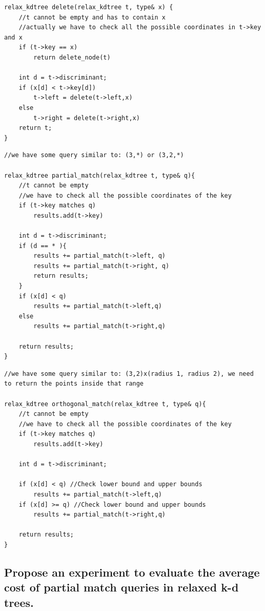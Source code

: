 \documentclass{article}
\begin{document}
\begin{lstlisting}[caption=Deletion of relaxed kd-trees, style=myC]
relax_kdtree delete(relax_kdtree t, type& x) {
    //t cannot be empty and has to contain x
    //actually we have to check all the possible coordinates in t->key and x
    if (t->key == x) 
        return delete_node(t)

    int d = t->discriminant;
    if (x[d] < t->key[d])
        t->left = delete(t->left,x)
    else
        t->right = delete(t->right,x)
    return t;
}
\end{lstlisting}



\begin{lstlisting}[caption=Partial match of relaxed kd-trees, style=myC]
//we have some query similar to: (3,*) or (3,2,*)

relax_kdtree partial_match(relax_kdtree t, type& q){
    //t cannot be empty
    //we have to check all the possible coordinates of the key
    if (t->key matches q) 
        results.add(t->key)

    int d = t->discriminant;
    if (d == * ){
        results += partial_match(t->left, q)
        results += partial_match(t->right, q)
        return results;
    }
    if (x[d] < q)
        results += partial_match(t->left,q)
    else
        results += partial_match(t->right,q)

    return results;
}

\end{lstlisting}


\begin{lstlisting}[caption=Orthogonal match of relaxed kd-trees, style=myC]
//we have some query similar to: (3,2)x(radius 1, radius 2), we need to return the points inside that range

relax_kdtree orthogonal_match(relax_kdtree t, type& q){
    //t cannot be empty
    //we have to check all the possible coordinates of the key
    if (t->key matches q) 
        results.add(t->key)

    int d = t->discriminant;
    
    if (x[d] < q) //Check lower bound and upper bounds
        results += partial_match(t->left,q)
    if (x[d] >= q) //Check lower bound and upper bounds
        results += partial_match(t->right,q)

    return results;
}
\end{lstlisting}




\subsection{Propose an experiment to evaluate the average cost of partial match
queries in relaxed k-d trees.}
\end{document}

